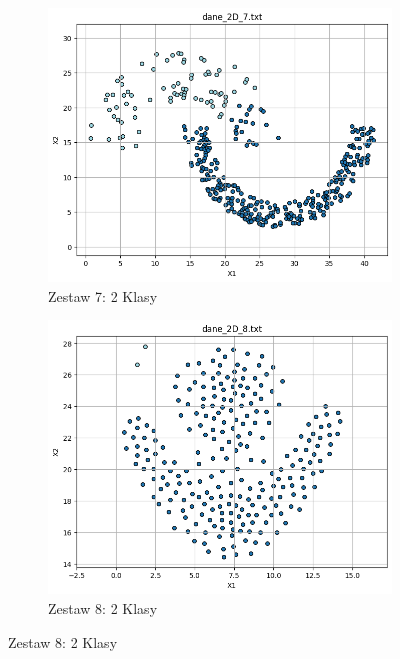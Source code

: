 \documentclass[polish,12pt,a4paper]{extarticle}
\begin{document}
\begin{figure}[h!]
    \centering
    \begin{subfigure}[b]{0.30\textwidth}
        \includegraphics[width=\linewidth]{img/hierarchical/centroid/data7.png}
        \captionsetup{labelformat=empty}
        \caption{Zestaw 7: 2 Klasy}
    \end{subfigure}
    \begin{subfigure}[b]{0.30\textwidth}
        \includegraphics[width=\linewidth]{img/hierarchical/centroid/data8.png}
        \captionsetup{labelformat=empty}
        \caption{Zestaw 8: 2 Klasy}
    \end{subfigure}
    \label{fig:data_grid}
\end{figure} \FloatBarrier
\end{document}
